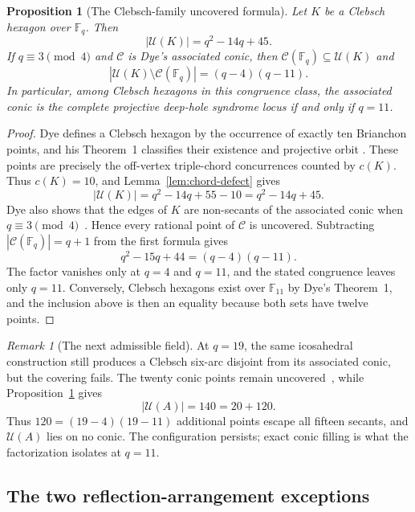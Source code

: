 \documentclass[11pt]{article}
\newtheorem{proposition}[theorem]{Proposition}
\theoremstyle{definition}
\theoremstyle{remark}
\newtheorem{remark}[theorem]{Remark}
\newcommand{\F}{\mathbb{F}}
\newcommand{\cC}{\mathcal{C}}
\newcommand{\cU}{\mathcal{U}}
\begin{document}
\begin{proposition}[The Clebsch-family uncovered formula]
\label{prop:clebsch-family-uncovered}
Let $K$ be a Clebsch hexagon over $\F_q$. Then
\[
 |\cU(K)|=q^2-14q+45.
\]
If $q\equiv3\pmod4$ and $\cC$ is Dye's associated conic, then
$\cC(\F_q)\subseteq\cU(K)$ and
\[
 |\cU(K)\setminus\cC(\F_q)|=(q-4)(q-11).
\]
In particular, among Clebsch hexagons in this congruence class, the
associated conic is the complete projective deep-hole syndrome locus if and
only if $q=11$.
\end{proposition}

\begin{proof}
Dye defines a Clebsch hexagon by the occurrence of exactly ten Brianchon
points, and his Theorem~1 classifies their existence and projective orbit
\cite[p.~271; Theorem~1, pp.~275--276]{Dye1991}. These points are precisely the off-vertex
triple-chord concurrences counted by $c(K)$. Thus $c(K)=10$, and
Lemma~\ref{lem:chord-defect} gives
\[
 |\cU(K)|=q^2-14q+55-10=q^2-14q+45.
\]
Dye also shows that the edges of $K$ are non-secants of the associated conic
when $q\equiv3\pmod4$~\cite[discussion preceding Theorem~6,
pp.~281--282]{Dye1991}. Hence every rational point of $\cC$ is uncovered.
Subtracting $|\cC(\F_q)|=q+1$ from the first formula gives
\[
 q^2-15q+44=(q-4)(q-11).
\]
The factor vanishes only at $q=4$ and $q=11$, and the stated congruence
leaves only $q=11$. Conversely, Clebsch hexagons exist over $\F_{11}$ by
Dye's Theorem~1, and the inclusion above is then an equality because both
sets have twelve points.
\end{proof}

\begin{remark}[The next admissible field]
At $q=19$, the same icosahedral construction still produces a Clebsch
six-arc disjoint from its associated conic, but the covering fails. The
twenty conic points remain uncovered~\cite[p.~281]{Dye1991}, while
Proposition~\ref{prop:clebsch-family-uncovered} gives
\[
 |\cU(A)|=140=20+120.
\]
Thus $120=(19-4)(19-11)$ additional points escape all fifteen secants, and
$\cU(A)$ lies on no conic. The configuration persists; exact conic filling
is what the factorization isolates at $q=11$.
\end{remark}

\subsection{The two reflection-arrangement exceptions}
\label{sec:reflection-exceptions}
\end{document}
